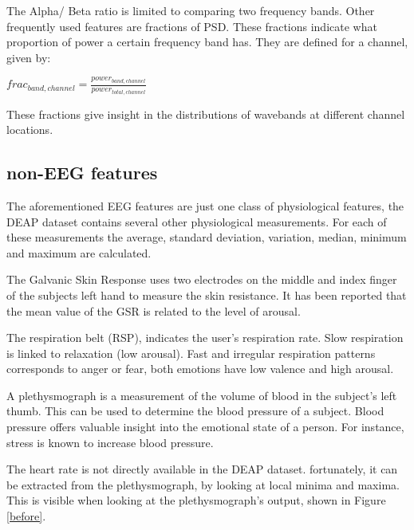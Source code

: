 \npar

The Alpha/ Beta ratio is limited to comparing two frequency bands. Other frequently used features are fractions of PSD. These fractions indicate what proportion of power a certain frequency band has. They are defined  for a channel, given by:

\begin{center}
$frac_{band,channel} = \frac{power_{band,channel}}{power_{total,channel}}$
\end{center}

These fractions give insight in the distributions of wavebands at different channel locations.

\subsection{non-EEG features}
The aforementioned EEG features are just one class of physiological features, the DEAP dataset contains several other physiological measurements\citep{DEAP}. For each of these measurements the average, standard deviation, variation, median, minimum and maximum are calculated.

\npar

The Galvanic Skin Response  uses two electrodes on the middle and index finger of the subjects left hand to measure the skin resistance. It has been reported that the mean value of the GSR is related to the level of arousal\citep{GSR, DEAP}.

\npar

The respiration belt (RSP), indicates the user's respiration rate. Slow respiration is linked to relaxation (low arousal). Fast and irregular respiration patterns corresponds to anger or fear, both emotions have low valence and high arousal\citep{DEAP}.

\npar

A plethysmograph is a measurement of the volume of blood in the subject's left thumb. This can be used to determine the blood pressure of a subject. Blood pressure offers valuable insight into the emotional state of a person. For instance, stress is known to increase blood pressure\citep{DEAP}.

\npar

The heart rate is not directly available in the DEAP dataset. fortunately, it can be extracted from the plethysmograph, by looking at local minima and maxima\citep{DEAP}. This is visible when looking at the plethysmograph's output, shown in Figure \ref{before}.

